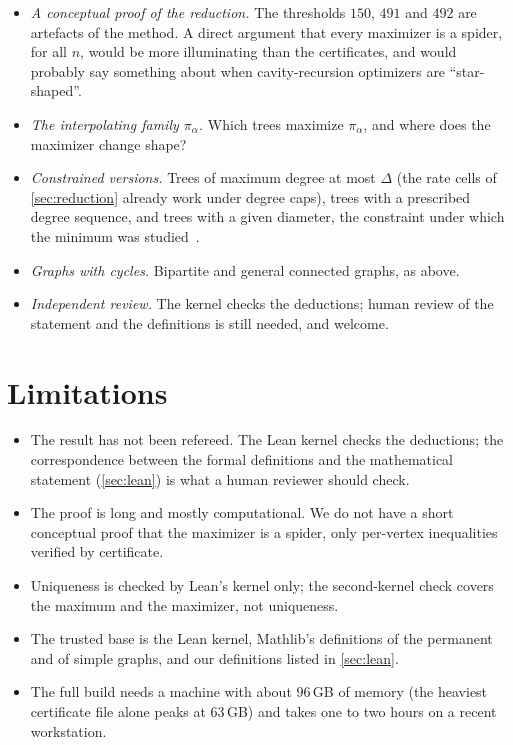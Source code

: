 \documentclass[11pt]{article}
\theoremstyle{definition}
\begin{document}
\begin{itemize}
\item \emph{A conceptual proof of the reduction.} The thresholds $150$, $491$ and $492$ are artefacts of
  the method. A direct argument that every maximizer is a spider, for all $n$, would be more
  illuminating than the certificates, and would probably say something about when cavity-recursion
  optimizers are ``star-shaped''.
\item \emph{The interpolating family $\pi_\alpha$.} Which trees maximize $\pi_\alpha$, and where does the
  maximizer change shape?
\item \emph{Constrained versions.} Trees of maximum degree at most $\Delta$ (the rate cells of
  \cref{sec:reduction} already work under degree caps), trees with a prescribed degree sequence, and trees
  with a given diameter, the constraint under which the minimum was studied~\cite{Wu2024}.
\item \emph{Graphs with cycles.} Bipartite and general connected graphs, as above.
\item \emph{Independent review.} The kernel checks the deductions; human review of the statement and the
  definitions is still needed, and welcome.
\end{itemize}

\section{Limitations}

\begin{itemize}
\item The result has not been refereed. The Lean kernel checks the deductions; the correspondence
  between the formal definitions and the mathematical statement (\cref{sec:lean}) is what a human
  reviewer should check.
\item The proof is long and mostly computational. We do not have a short conceptual proof that the
  maximizer is a spider, only per-vertex inequalities verified by certificate.
\item Uniqueness is checked by Lean's kernel only; the second-kernel check covers the maximum and the
  maximizer, not uniqueness.
\item The trusted base is the Lean kernel, Mathlib's definitions of the permanent and of simple graphs,
  and our definitions listed in \cref{sec:lean}.
\item The full build needs a machine with about $96$\,GB of memory (the heaviest certificate file alone
  peaks at $63$\,GB) and takes one to two hours on a recent workstation.
\end{itemize}
\end{document}
